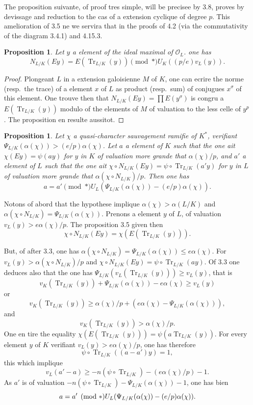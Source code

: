 \documentclass[12pt,a4paper]{article}
\theoremstyle{plain}
\newtheorem{proposition}[theorem]{Proposition}
\theoremstyle{definition}
\theoremstyle{remark}
\DeclareMathOperator{\Tr}{Tr}
\newcommand{\cO}{\mathcal{O}}
\providecommand{\cO}{\mathcal{O}}
\providecommand{\Tr}{\operatorname{Tr}}
\begin{document}
The proposition suivante, of proof tres simple, will be precisee by 3.8, proves by devissage and reduction to the cas of a extension cyclique of degree $p$. This amelioration of 3.5 ne we servira that in the proofs of 4.2 (via the commutativity of the diagram 3.4.1) and 4.15.3.

\begin{proposition}\label{prop:3.5}
Let $y$ a element of the ideal maximal of $\cO_L$. one has
\[
N_{L/K}(Ey) = E(\Tr_{L/K}(y)) \pmod{*} U_K((p/e) v_L(y)).
\]
\end{proposition}

\begin{proof}
Plongeant $L$ in a extension galoisienne $M$ of $K$, one can ecrire the norme (resp.~the trace) of a element $x$ of $L$ as product (resp.~sum) of conjugues $x^\sigma$ of this element. One trouve then that $N_{L/K}(Ey) = \prod E(y^\sigma)$ is congru a $E(\Tr_{L/K}(y))$ modulo of the elements of $M$ of valuation to the less celle of $y^p$. The proposition en resulte aussitot.
\end{proof}

\begin{proposition}\label{prop:3.6}
Let $\chi$ a quasi-character sauvagement ramifie of $K^*$, verifiant $\Psi_{L/K}(\alpha(\chi)) > (e/p) \alpha(\chi)$. Let $a$ a element of $K$ such that the one ait $\chi(Ey) = \psi(ay)$ for $y$ in $K$ of valuation more grande that $\alpha(\chi)/p$, and $a'$ a element of $L$ such that the one ait $\chi \circ N_{L/K}(Ey) = \psi \circ \Tr_{L/K}(a'y)$ for $y$ in $L$ of valuation more grande that $\alpha(\chi \circ N_{L/K})/p$. Then one has
\[
a = a' \pmod{*} U_L(\Psi_{L/K}(\alpha(\chi)) - (e/p) \alpha(\chi)).
\]
\end{proposition}

Notons of abord that the hypothese implique $\alpha(\chi) > \alpha(L/K)$ and $\alpha(\chi \circ N_{L/K}) = \Psi_{L/K}(\alpha(\chi))$. Prenons a element $y$ of $L$, of valuation $v_L(y) > e\alpha(\chi)/p$. The proposition 3.5 given then
\[
\chi \circ N_{L/K}(Ey) = \chi(E(\Tr_{L/K}(y))).
\]

But, of after 3.3, one has $\alpha(\chi \circ N_{L/K}) = \Psi_{L/K}(\alpha(\chi)) \leq e\alpha(\chi)$. For $v_L(y) > \alpha(\chi \circ N_{L/K})/p$ and $\chi \circ N_{L/K}(Ey) = \psi \circ \Tr_{L/K}(a y)$. Of 3.3 one deduces also that the one has $\Psi_{L/K}(v_L(\Tr_{L/K}(y))) \geq v_L(y)$, that is
\[
v_K(\Tr_{L/K}(y)) + \Psi_{L/K}(\alpha(\chi)) - e\alpha(\chi) \geq v_L(y)
\]
or
\[
v_K(\Tr_{L/K}(y)) \geq \alpha(\chi)/p + (e\alpha(\chi) - \Psi_{L/K}(\alpha(\chi))),
\]
and
\[
v_K(\Tr_{L/K}(y)) > \alpha(\chi)/p.
\]
One en tire the equality $\chi(E(\Tr_{L/K}(y))) = \psi(a \Tr_{L/K}(y))$. For every element $y$ of $K$ verifiant $v_L(y) > e\alpha(\chi)/p$, one has therefore
\[
\psi \circ \Tr_{L/K}((a-a')y) = 1,
\]
this which implique
\[
v_L(a'-a) \geq -n(\psi \circ \Tr_{L/K}) - (e\alpha(\chi)/p) - 1.
\]
As $a'$ is of valuation $-n(\psi \circ \Tr_{L/K}) - \Psi_{L/K}(\alpha(\chi)) - 1$, one has bien
\[
a = a' \pmod{*} U_L(\Psi_{L/K}(\alpha(\chi)) - (e/p) \alpha(\chi)). \qedhere
\]
\end{document}
